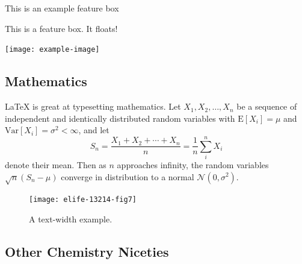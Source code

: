 \documentclass[9pt,lineno]{elife}
\begin{document}
\begin{featurebox}
\caption{This is an example feature box}
\label{box:simple}
This is a feature box. It floats!
\medskip

\texttt{[image: example-image]}

\lipsum[1]
\end{featurebox}

\subsection{Mathematics}

\LaTeX{} is great at typesetting mathematics. Let $X_1, X_2, \ldots, X_n$ be a sequence of independent and identically distributed random variables with $\text{E}[X_i] = \mu$ and $\text{Var}[X_i] = \sigma^2 < \infty$, and let
\begin{equation}
\label{eq:CLT}
S_n = \frac{X_1 + X_2 + \cdots + X_n}{n}
      = \frac{1}{n}\sum_{i}^{n} X_i
\end{equation}
denote their mean. Then as $n$ approaches infinity, the random variables $\sqrt{n}(S_n - \mu)$ converge in distribution to a normal $\mathcal{N}(0, \sigma^2)$.

\lipsum[3] 

\begin{figure}
\texttt{[image: elife-13214-fig7]}
\caption{A text-width example.}
\label{fig:view}
\label{figsupp:sf1}
\label{videosupp:sv1}
\label{figdata:first}
\label{figdata:second}
\end{figure}

\subsection{Other Chemistry Niceties}
\end{document}
